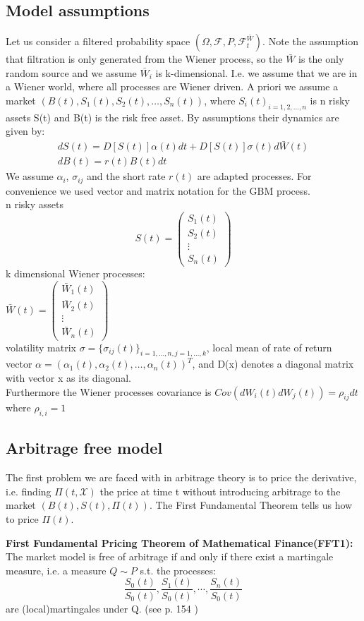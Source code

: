 \subsection{Model assumptions}
Let us consider a filtered probability space $(\Omega, \mathcal{F}, P, \mathcal{F}_t^{\bar{W}})$. Note the assumption that filtration is only generated from the Wiener process, so the $\bar{W}$ is the only random source and we assume $\bar{W}_i$ is k-dimensional. I.e. we assume that we are in a Wiener world, where all processes are Wiener driven. A priori we assume a market $(B(t),S_1(t), S_2(t),\ldots, S_n(t))$, where ${S_i(t)}_{i=1,2,\ldots,n}$ is n risky assets S(t) and B(t) is the risk free asset. By assumptions their dynamics are given by:\\
\begin{align}
dS(t)=D[S(t)]\alpha(t)dt+D[S(t)]\sigma(t)d\bar{W}(t)\label{GBM-P} \\
dB(t)=r(t)B(t)dt
\end{align}
We assume $\alpha_i$, $\sigma_{ij}$ and the short rate $r(t)$ are adapted processes.
For convenience we used vector and matrix notation for the GBM process.\\
n risky assets
$$S(t)=\begin{pmatrix}
S_1(t)\\
S_2(t)\\
\vdots\\
S_n(t)
\end{pmatrix}
$$
k dimensional Wiener processes:\\
$\bar{W}(t)=\begin{pmatrix}
\bar{W}_1(t)\\
\bar{W}_2(t)\\
\vdots\\
\bar{W}_n(t)
\end{pmatrix}
$\\
volatility matrix $\sigma=\{\sigma_{ij}(t)\}_{i=1,\ldots,n,j=1,\ldots,k}$, local mean of rate of return vector $\alpha=(\alpha_1(t), \alpha_2(t), \ldots, \alpha_n(t))^T$, and D(x) denotes a diagonal matrix with vector x as its diagonal.\\ 
Furthermore the Wiener processes covariance is $Cov(dW_i(t)dW_j(t))=\rho_{ij}dt$ where $\rho_{i,i}=1$

\subsection{Arbitrage free model}
The first problem we are faced with in arbitrage theory is to price the derivative, i.e. finding $\Pi(t,\mathcal{X})$ the price at time t without introducing arbitrage to the market $(B(t), S(t), \Pi(t))$. The First Fundamental Theorem tells us how to price $\Pi(t)$.
\begin{theorem}\label{FFT1}
\textbf{First Fundamental Pricing Theorem of Mathematical Finance(FFT1): } The market model is free of arbitrage if and only if there exist a martingale measure, i.e. a measure $Q\sim P$ s.t. the processes:
$$\frac{S_0(t)}{S_0(t)}, \frac{S_1(t)}{S_0(t)}, \cdots, \frac{S_n(t)}{S_0(t)}$$
are (local)martingales under Q.
(see p. 154 \parencite{finKont})
\end{theorem}

